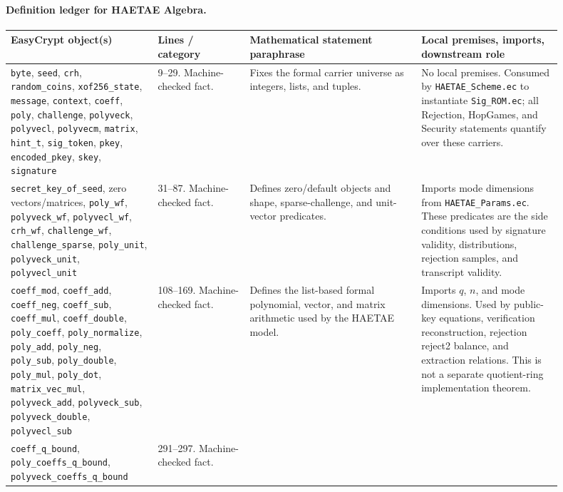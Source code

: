 \documentclass[11pt]{report}
\DeclareRobustCommand{\file}[1]{\ifmmode\text{\nolinkurl{#1}}\else\nolinkurl{#1}\fi}
\DeclareRobustCommand{\ec}[1]{\ifmmode\text{\nolinkurl{#1}}\else\nolinkurl{#1}\fi}
\theoremstyle{definition}
\theoremstyle{plain}
\begin{document}
\paragraph{Definition ledger for HAETAE Algebra.}
{\footnotesize
\begin{longtable}{p{0.24\linewidth}p{0.15\linewidth}p{0.28\linewidth}p{0.23\linewidth}}
\toprule
\textbf{EasyCrypt object(s)} & \textbf{Lines / category} &
\textbf{Mathematical statement paraphrase} &
\textbf{Local premises, imports, downstream role} \\
\midrule
\ec{byte}, \ec{seed}, \ec{crh}, \ec{random\_coins}, \ec{xof256\_state},
\ec{message}, \ec{context}, \ec{coeff}, \ec{poly}, \ec{challenge},
\ec{polyveck}, \ec{polyvecl}, \ec{polyvecm}, \ec{matrix}, \ec{hint\_t},
\ec{sig\_token}, \ec{pkey}, \ec{encoded\_pkey}, \ec{skey}, \ec{signature} &
9--29. Machine-checked fact. &
Fixes the formal carrier universe as integers, lists, and tuples. &
No local premises.  Consumed by \file{HAETAE\_Scheme.ec} to instantiate
\file{Sig\_ROM.ec}; all Rejection, HopGames, and Security statements quantify
over these carriers. \\
\midrule
\ec{secret\_key\_of\_seed}, zero vectors/matrices, \ec{poly\_wf},
\ec{polyveck\_wf}, \ec{polyvecl\_wf}, \ec{crh\_wf},
\ec{challenge\_wf}, \ec{challenge\_sparse}, \ec{poly\_unit},
\ec{polyveck\_unit}, \ec{polyvecl\_unit} &
31--87. Machine-checked fact. &
Defines zero/default objects and shape, sparse-challenge, and unit-vector
predicates. &
Imports mode dimensions from \file{HAETAE\_Params.ec}.  These predicates are
the side conditions used by signature validity, distributions, rejection
samples, and transcript validity. \\
\midrule
\ec{coeff\_mod}, \ec{coeff\_add}, \ec{coeff\_neg}, \ec{coeff\_sub},
\ec{coeff\_mul}, \ec{coeff\_double}, \ec{poly\_coeff},
\ec{poly\_normalize}, \ec{poly\_add}, \ec{poly\_neg}, \ec{poly\_sub},
\ec{poly\_double}, \ec{poly\_mul}, \ec{poly\_dot},
\ec{matrix\_vec\_mul}, \ec{polyveck\_add}, \ec{polyveck\_sub},
\ec{polyveck\_double}, \ec{polyvecl\_sub} &
108--169. Machine-checked fact. &
Defines the list-based formal polynomial, vector, and matrix arithmetic used
by the HAETAE model. &
Imports \(q\), \(n\), and mode dimensions.  Used by public-key equations,
verification reconstruction, rejection reject2 balance, and extraction
relations.  This is not a separate quotient-ring implementation theorem. \\
\midrule
\ec{coeff\_q\_bound}, \ec{poly\_coeffs\_q\_bound},
\ec{polyveck\_coeffs\_q\_bound} &
291--297. Machine-checked fact. &

\end{longtable}}
\end{document}
